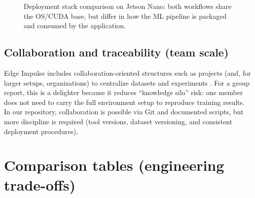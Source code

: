 \begin{figure}[htbp]
	\centering
	
	\caption{Deployment stack comparison on Jetson Nano: both workflows share the OS/CUDA base, but differ in how the ML pipeline is packaged and consumed by the application.}
	\label{fig:edge_impulse_deploy_stack}
\end{figure}

\subsection{Collaboration and traceability (team scale)}

\noindent
Edge Impulse includes collaboration-oriented structures such as projects (and, for larger setups, organizations) to centralize datasets and experiments \cite{EdgeImpulseStudioOverview}.
For a group report, this is a delighter because it reduces ``knowledge silo'' risk:
one member does not need to carry the full environment setup to reproduce training results.
In our repository, collaboration is possible via Git and documented scripts, but more discipline is required (tool versions, dataset versioning, and consistent deployment procedures).

\section{Comparison tables (engineering trade-offs)}
\label{sec:edge_impulse_tables}

